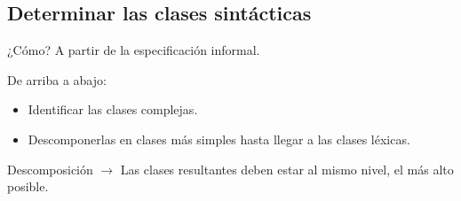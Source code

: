 \documentclass[\main/ApuntesPL.tex]{subfiles}
\begin{document}
    \subsection{Determinar las clases sintácticas}
      \par
      ¿Cómo? A partir de la especificación informal.

      \bigskip
      \par
      De arriba a abajo:
      \begin{itemize}
        \item Identificar las clases complejas.
        \item Descomponerlas en clases más simples hasta llegar a las clases léxicas.
      \end{itemize}

      \bigskip
      \par
      Descomposición $\rightarrow$ Las clases resultantes deben estar al mismo nivel, el más alto posible.
\end{document}
